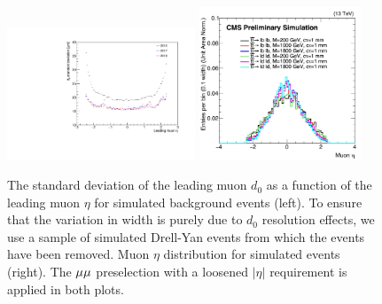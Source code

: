 \begin{figure}
\centering
\includegraphics[width=0.5\textwidth]{figures/large_eta/d0_stdDev_vs_eta_compareYears.pdf}
\includegraphics[width=0.43\textwidth]{figures/large_eta/muonEta.pdf}
\caption{The standard deviation of the leading muon $d_0$ as a function of the leading muon $\eta$ for simulated background events (left). To ensure that the variation in width is purely due to $d_0$ resolution effects, we use a sample of simulated Drell-Yan events from which the \ztautaull events have been removed. Muon $\eta$ distribution for simulated \stoptolb events (right). The ${\mu}{\mu}$ preselection with a loosened $|\eta|$ requirement is applied in both plots.}
\label{large_eta_mu}
\end{figure}
